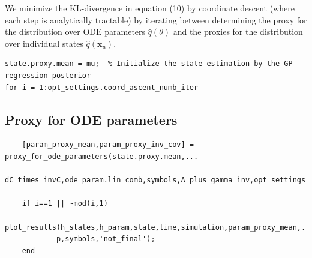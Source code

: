 \begin{par}
We minimize the KL-divergence in equation (10) by coordinate descent (where each step is analytically tractable) by iterating between determining the proxy for the distribution over ODE parameters $\hat{q}(\theta)$ and the proxies for the distribution over individual states $\hat{q}(\mathbf{x}_u)$.
\end{par} \vspace{1em}
\color{RoyalPurple}\begin{verbatim}
state.proxy.mean = mu;  % Initialize the state estimation by the GP regression posterior
for i = 1:opt_settings.coord_ascent_numb_iter
\end{verbatim}
\color{black}
\begin{par}
\subsection{ Proxy for ODE parameters }
\end{par} \vspace{1em}
\color{RoyalPurple}\begin{verbatim}
    [param_proxy_mean,param_proxy_inv_cov] = proxy_for_ode_parameters(state.proxy.mean,...
        dC_times_invC,ode_param.lin_comb,symbols,A_plus_gamma_inv,opt_settings);

    if i==1 || ~mod(i,1)
        plot_results(h_states,h_param,state,time,simulation,param_proxy_mean,...
            p,symbols,'not_final');
    end
\end{verbatim}
\color{black}

